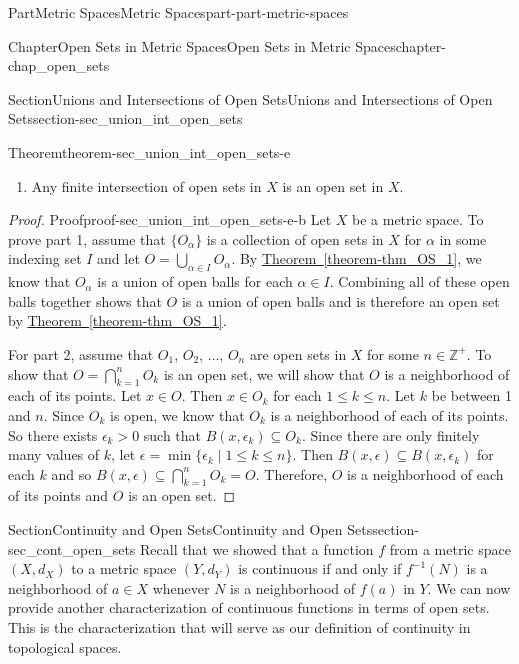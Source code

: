 \documentclass[oneside,10pt,]{book}
\newcommand{\xreffont}{\relax}
\numberwithin{equation}{chapter}
\newcommand{\Z}{\mathbb{Z}}
\newcommand{\gt}{>}
\begin{document}
\begin{partptx}{Part}{Metric Spaces}{}{Metric Spaces}{}{}{part-part-metric-spaces}
\begin{chapterptx}{Chapter}{Open Sets in Metric Spaces}{}{Open Sets in Metric Spaces}{}{}{chapter-chap_open_sets}
\begin{sectionptx}{Section}{Unions and Intersections of Open Sets}{}{Unions and Intersections of Open Sets}{}{}{section-sec_union_int_open_sets}
\begin{theorem}{Theorem}{}{}{theorem-sec_union_int_open_sets-e}
\begin{enumerate}
\item{}Any finite intersection of open sets in \(X\) is an open set in \(X\).%
\end{enumerate}
%
\end{theorem}
\begin{proof}{Proof}{}{proof-sec_union_int_open_sets-e-b}
Let \(X\) be a metric space. To prove part 1, assume that \(\{O_{\alpha}\}\) is a collection of open sets in \(X\) for \(\alpha\) in some indexing set \(I\) and let \(O = \bigcup_{\alpha \in I} O_{\alpha}\). By \hyperref[theorem-thm_OS_1]{Theorem~{\xreffont\ref{theorem-thm_OS_1}}}, we know that \(O_{\alpha}\) is a union of open balls for each \(\alpha \in I\). Combining all of these open balls together shows that \(O\) is a union of open balls and is therefore an open set by \hyperref[theorem-thm_OS_1]{Theorem~{\xreffont\ref{theorem-thm_OS_1}}}.%
\par
For part 2, assume that \(O_1\), \(O_2\), \(\ldots\), \(O_n\) are open sets in \(X\) for some \(n \in \Z^+\). To show that \(O = \bigcap_{k=1}^n O_k\) is an open set, we will show that \(O\) is a neighborhood of each of its points. Let \(x \in O\). Then \(x \in O_k\) for each \(1 \leq k \leq n\). Let \(k\) be between 1 and \(n\). Since \(O_k\) is open, we know that \(O_k\) is a neighborhood of each of its points. So there exists \(\epsilon_k \gt 0\) such that \(B(x, \epsilon_k) \subseteq O_k\). Since there are only finitely many values of \(k\), let \(\epsilon = \min\{\epsilon_k \mid 1 \leq k \leq n\}\). Then \(B(x, \epsilon) \subseteq B(x, \epsilon_k)\) for each \(k\) and so \(B(x, \epsilon) \subseteq \bigcap_{k=1}^n O_k = O\). Therefore, \(O\) is a neighborhood of each of its points and \(O\) is an open set.%
\end{proof}
\end{sectionptx}
%
%
\typeout{************************************************}
\typeout{************************************************}
%
\begin{sectionptx}{Section}{Continuity and Open Sets}{}{Continuity and Open Sets}{}{}{section-sec_cont_open_sets}
Recall that we showed that a function \(f\) from a metric space \((X,d_X)\) to a metric space \((Y,d_Y)\) is continuous if and only if \(f^{-1}(N)\) is a neighborhood of \(a \in X\) whenever \(N\) is a neighborhood of \(f(a)\) in \(Y\). We can now provide another characterization of continuous functions in terms of open sets. This is the characterization that will serve as our definition of continuity in topological spaces.%

\end{sectionptx}
\end{chapterptx}
\end{partptx}
\end{document}
